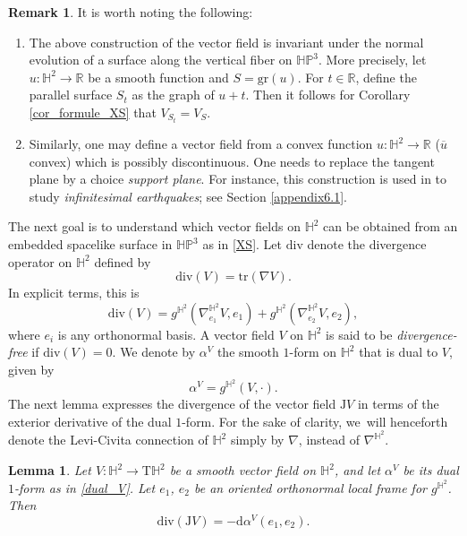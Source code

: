\documentclass[JEP,XML,SOM,Unicode,NoEqCountersInSection, NoFloatCountersInSection,published]{cedram}
\theoremstyle{plain}
\newtheorem{lemma}[cor]{Lemma}
\theoremstyle{definition}
\newtheorem{remark}[cor]{Remark}
\newcommand{\HP}{\mathbb{HP}^3}
\begin{document}
\begin{remark}
It is worth noting the following:
\begin{enumerate}
\item The above construction of the vector field is invariant under the normal evolution of a surface along the vertical fiber on $\HP$. More precisely, let $u:\mathbb{H}^2\to\mathbb{R}$ be a smooth function and $S=\mathrm{gr}(u)$. For $t\in\mathbb{R}$, define the parallel surface $S_t$ as the graph of $u+t$. Then it follows for Corollary \ref{cor_formule_XS} that $V_{S_t}=V_S$.
\item Similarly, one may define a vector field from a convex function $u:\mathbb{H}^2\to\mathbb{R}$ (\ie $\overline{u}$ convex) which is possibly discontinuous. One needs to replace the tangent plane by a choice \emph{support plane}. For instance, this construction is used in \cite{diaf2023Infearth} to study \emph{infinitesimal earthquakes}; see Section \ref{appendix6.1}.
\end{enumerate}
\end{remark}
The next goal is to understand which vector fields on $\mathbb{H}^2$ can be obtained from an embedded spacelike surface in $\HP$ as in \eqref{XS}. Let $\mathrm{div}$ denote the divergence operator on $\mathbb{H}^2$ defined by
\[
\mathrm{div}(V)=\mathrm{tr}(\nabla V).
\]
In explicit terms, this is
\begin{equation}\label{formula_divergence}
\mathrm{div}(V)=g^{\mathbb{H}^2}(\nabla^{\mathbb{H}^2}_{e_1}V,e_1)+g^{\mathbb{H}^2}(\nabla^{\mathbb{H}^2}_{e_2}V,e_2),
\end{equation} where $e_i$ is any orthonormal basis. A vector field \(V \) on \(\mathbb{H}^2 \) is said to be \emph{divergence-free} if \(\mathrm{div}(V) = 0 \).
We denote by \(\alpha^V \) the smooth $1$-form on \(\mathbb{H}^2 \) that is dual to \(V \), given by
\begin{equation}\label{dual_V}
\alpha^V = g^{\mathbb{H}^2}(V, \cdot).
\end{equation}
The next lemma expresses the divergence of the vector field \(\mathrm{J}V \) in terms of the exterior derivative of the dual $1$-form.
For the sake of clarity, we~will henceforth denote the Levi-Civita connection of \(\mathbb{H}^2 \) simply by \(\nabla \), instead of \(\nabla^{\mathbb{H}^2} \).

\begin{lemma}\label{divergence_in_terms_of_forms}
Let \(V: \mathbb{H}^2 \to \mathrm{T}\mathbb{H}^2 \) be a smooth vector field on \(\mathbb{H}^2 \), and let \(\alpha^V \) be its dual $1$-form as in \eqref{dual_V}.
Let \(e_1 \), \(e_2 \) be an oriented orthonormal local frame for \(g^{\mathbb{H}^2} \). Then
\[
\mathrm{div}(\mathrm{J}V) =- \mathrm{d} \alpha^V(e_1, e_2).
\]
\end{lemma}
\end{document}
